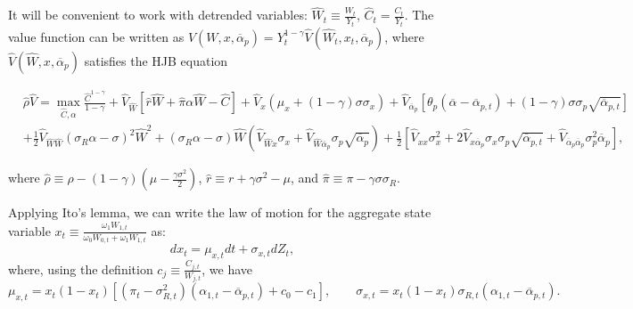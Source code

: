 It will be convenient to work with detrended variables: $\hat{W}_t \equiv \frac{W_t}{Y_t}$, $\hat{C}_t = \frac{C_t}{Y_t}$. The value function can be written as $V(W,x, \overline{\alpha}_p) = Y_t^{1-\gamma} \hat{V}(\hat{W}_t, x_t, \overline{\alpha}_p)$, where $\hat{V}(\hat{W},x, \overline{\alpha}_p)$ satisfies the HJB equation\small
\begin{small}
	\begin{align}
		&\hat{\rho} \hat{V} =  \max_{\hat{C},\alpha}\frac{\hat{C}^{1-\gamma}}{1-\gamma} + \hat{V}_{\hat{W}} \left[ \hat{r} \hat{W} + \hat{\pi}\alpha \hat{W} -\hat{C}  \right] + \hat{V}_x \left(\mu_x +(1-\gamma) \sigma \sigma_x \right)+ \hat{V}_{\overline{\alpha}_p} \left[\theta_p (\overline{\alpha}-\overline{\alpha}_{p,t})+(1-\gamma) \sigma \sigma_p \sqrt{\overline{\alpha}_{p,t}} \right] \nonumber\\
		&+ \frac{1}{2} \hat{V}_{\hat{W}\hat{W}} \left(\sigma_R \alpha-\sigma\right)^2 \hat{W}^2+(\sigma_R \alpha -\sigma) \hat{W} \left( \hat{V}_{\hat{W}x} \sigma_x  + \hat{V}_{\hat{W}\overline{\alpha}_p} \sigma_p \sqrt{\overline{\alpha}_p}\right)+ \frac{1}{2} \left[
		\hat{V}_{xx} \sigma_x^2 
		+ 2 \hat{V}_{x \overline{\alpha}_p} \sigma_x \sigma_p \sqrt{\overline{\alpha}_{p,t}} 
		+ \hat{V}_{\overline{\alpha}_p\overline{\alpha}_p} \sigma_p^2\overline{\alpha}_p\right],\nonumber
	\end{align}
\end{small}

where $\hat{\rho} \equiv \rho - (1-\gamma) \left(\mu - \frac{\gamma \sigma^2}{2} \right)$, $\hat{r} \equiv r + \gamma \sigma^2 - \mu$, and $\hat{\pi} \equiv \pi - \gamma \sigma \sigma_R$.

Applying Ito's lemma, we can write the law of motion for the aggregate state variable $x_t \equiv \frac{\omega_1 W_{1,t}}{\omega_0 W_{0,t} + \omega_1 W_{1,t}}$ as:
\begin{equation*}
	d x_t = \mu_{x,t} dt + \sigma_{x,t} d Z_t,
\end{equation*}
where, using the definition $c_{j} \equiv \frac{C_{j,t}}{W_{j,t}}$, we have
\begin{equation}
	\mu_{x,t} = x_t(1-x_t) \left[ (\pi_t-\sigma_{R,t}^2) \left( \alpha_{1,t} - \overline{\alpha}_{p,t} \right) + c_0 - c_1 \right], \qquad 
	\sigma_{x,t} = x_t (1-x_t) \sigma_{R,t} \left( \alpha_{1,t} - \overline{\alpha}_{p,t}\right).
\end{equation}



